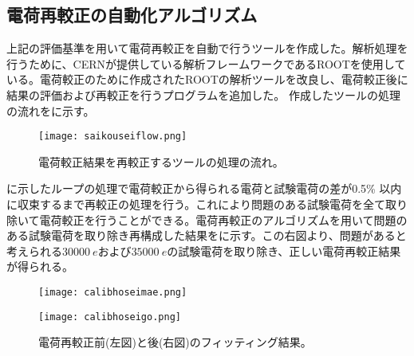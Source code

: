\subsection{電荷再較正の自動化アルゴリズム}
上記の評価基準を用いて電荷再較正を自動で行うツールを作成した。解析処理を行うために、CERNが提供している解析フレームワークであるROOTを使用している。電荷較正のために作成されたROOTの解析ツールを改良し、電荷較正後に結果の評価および再較正を行うプログラムを追加した。
作成したツールの処理の流れをに示す。

\begin{figure}[tbp]
  \centering
  \texttt{[image: saikouseiflow.png]}
  \caption[電荷較正結果を再較正するツールの処理の流れ]{電荷較正結果を再較正するツールの処理の流れ。}
  \label{fig:saikouseiflow}
\end{figure}


に示したループの処理で電荷較正から得られる電荷と試験電荷の差が0.5\% 以内に収束するまで再較正の処理を行う。これにより問題のある試験電荷を全て取り除いて電荷較正を行うことができる。電荷再較正のアルゴリズムを用いて問題のある試験電荷を取り除き再構成した結果をに示す。この右図より、問題があると考えられる$30000\ \si{e}$および$35000\ \si{e}$の試験電荷を取り除き、正しい電荷再較正結果が得られる。

\begin{figure}[tbp]
  \begin{minipage}[b]{0.5\linewidth}
    \centering
    \texttt{[image: calibhoseimae.png]}
  \end{minipage}
  \begin{minipage}[b]{0.5\linewidth}
    \centering
    \texttt{[image: calibhoseigo.png]}
  \end{minipage}
  \caption[電荷再較正前後のフィッティング結果]{電荷再較正前(左図)と後(右図)のフィッティング結果。}
  \label{fig:calibhosei}
\end{figure}


